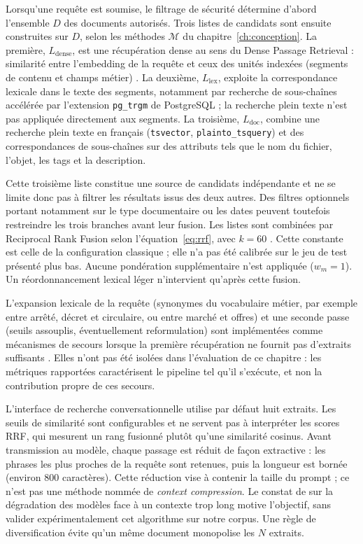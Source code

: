 Lorsqu'une requête est soumise, le filtrage de sécurité détermine d'abord l'ensemble $D$ des documents autorisés. Trois listes de candidats sont ensuite construites sur $D$, selon les méthodes $\mathcal{M}$ du chapitre~\ref{ch:conception}. La première, $L_{\mathrm{dense}}$, est une récupération dense au sens du Dense Passage Retrieval : similarité entre l'embedding de la requête et ceux des unités indexées (segments de contenu et champs métier) . La deuxième, $L_{\mathrm{lex}}$, exploite la correspondance lexicale dans le texte des segments, notamment par recherche de sous-chaînes accélérée par l'extension \texttt{pg\_trgm} de PostgreSQL ; la recherche plein texte n'est pas appliquée directement aux segments. La troisième, $L_{\mathrm{doc}}$, combine une recherche plein texte en français (\texttt{tsvector}, \texttt{plainto\_tsquery}) et des correspondances de sous-chaînes sur des attributs tels que le nom du fichier, l'objet, les tags et la description.

Cette troisième liste constitue une source de candidats indépendante et ne se limite donc pas à filtrer les résultats issus des deux autres. Des filtres optionnels portant notamment sur le type documentaire ou les dates peuvent toutefois restreindre les trois branches avant leur fusion. Les listes sont combinées par Reciprocal Rank Fusion selon l'équation~\eqref{eq:rrf}, avec $k=60$ . Cette constante est celle de la configuration classique ; elle n'a pas été calibrée sur le jeu de test présenté plus bas. Aucune pondération supplémentaire n'est appliquée ($w_{m} = 1$). Un réordonnancement lexical léger n'intervient qu'après cette fusion.

L'expansion lexicale de la requête (synonymes du vocabulaire métier, par exemple entre \og arrêté\fg{}, \og décret\fg{} et \og circulaire\fg{}, ou entre \og marché\fg{} et \og offres\fg{}) et une seconde passe (seuils assouplis, éventuellement reformulation) sont implémentées comme mécanismes de secours lorsque la première récupération ne fournit pas d'extraits suffisants . Elles n'ont pas été isolées dans l'évaluation de ce chapitre : les métriques rapportées caractérisent le pipeline tel qu'il s'exécute, et non la contribution propre de ces secours.

L'interface de recherche conversationnelle utilise par défaut huit extraits. Les seuils de similarité sont configurables et ne servent pas à interpréter les scores RRF, qui mesurent un rang fusionné plutôt qu'une similarité cosinus. Avant transmission au modèle, chaque passage est réduit de façon extractive : les phrases les plus proches de la requête sont retenues, puis la longueur est bornée (environ 800 caractères). Cette réduction vise à contenir la taille du prompt ; ce n'est pas une méthode nommée de \textit{context compression}. Le constat de  sur la dégradation des modèles face à un contexte trop long motive l'objectif, sans valider expérimentalement cet algorithme sur notre corpus. Une règle de diversification évite qu'un même document monopolise les $N$ extraits.

